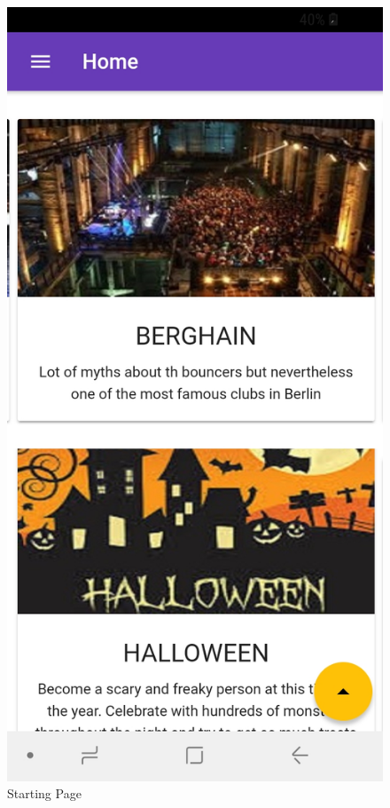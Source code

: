 \documentclass[12pt]{article}
\begin{document}
\begin{figure}[H]
  \includegraphics[width=\linewidth]{figures/Main.jpg}
  \caption{Starting Page}\label{fig:awesome_image1}

\end{figure}
\end{document}
